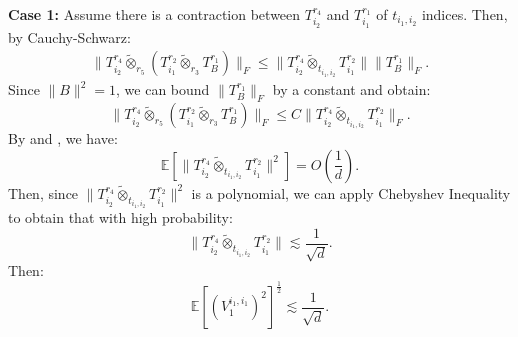 \documentclass[]{article}
\numberwithin{equation}{section}
\theoremstyle{definition}
\newcommand{\EE}{\mathbb{E}}
\begin{document}
\textbf{Case 1: }Assume there is a contraction between $T_{i_2}^{r_4}$ and $T^{r_1}_{i_1}$ of $t_{i_{1},i_{2}}$ indices. Then, by Cauchy-Schwarz: 
\begin{align}
    \| T_{i_2}^{r_4} \tilde{\otimes}_{r_5} \left ( T^{r_2}_{i_1} \tilde{\otimes}_{r_3}T^{r_1}_{B} \right )\|_{F} \leq \| T_{i_2}^{r_4} \tilde{\otimes}_{t_{i_{1},i_{2}}} T^{r_2}_{i_1} \| \|T^{r_1}_{B}\|_{F}.
    \label{eq:CS_contractions}
\end{align}
Since $\| B\|^2 = 1$, we can bound $\|T^{r_1}_{B}\|_{F}$ by a constant and obtain: 
\begin{equation}
    \| T_{i_2}^{r_4} \tilde{\otimes}_{r_5} \left ( T^{r_2}_{i_1} \tilde{\otimes}_{r_3}T^{r_1}_{B} \right )\|_{F}\leq C\| T_{i_2}^{r_4} \tilde{\otimes}_{t_{i_{1},i_{2}}} T^{r_2}_{i_1} \|_F.
\end{equation}
By  and , we have: 
\begin{equation}
    \EE\left [ \| T_{i_2}^{r_4} \tilde{\otimes}_{t_{i_{1},i_{2}}} T^{r_2}_{i_1} \|^{2} \right ] = O(\dfrac{1}{d}).
\end{equation} 
Then, since $\| T_{i_2}^{r_4} \tilde{\otimes}_{t_{i_{1},i_{2}}} T^{r_2}_{i_1} \|^{2} $ is a polynomial, we can apply Chebyshev Inequality to obtain that with high probability: 
\begin{equation}
    \| T_{i_2}^{r_4} \tilde{\otimes}_{t_{i_{1},i_{2}}} T^{r_2}_{i_1} \| \lesssim \dfrac{1}{\sqrt{d}}.
\end{equation}
Then: 
\begin{equation}
    \EE[(V^{i_1,i_1}_1)^2]^{\frac{1}{2}} \lesssim \dfrac{1}{\sqrt{d}}. 
    \label{eq:bound_V_1_squared}
\end{equation}
\end{document}
